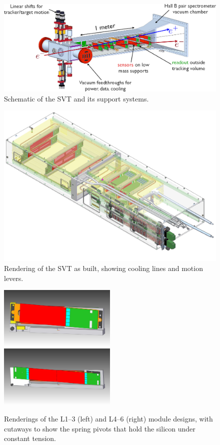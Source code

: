 \begin{figure}[ht]
    \includegraphics[width=\textwidth]{detector/figs/svt_cutaway}
    \caption{Schematic of the SVT and its support systems.}
    \label{fig:svt-schematic}
\end{figure}

\begin{figure}[ht]
    \includegraphics[width=\textwidth]{detector/figs/svt_drawing}
    \caption{Rendering of the SVT as built, showing cooling lines and motion levers.}
    \label{fig:svt-drawing}
\end{figure}

\begin{figure}[ht]
    \includegraphics[width=0.5\textwidth]{detector/figs/svt_l123_drawing}
    \includegraphics[width=0.5\textwidth]{detector/figs/svt_l456_drawing}
    \caption{Renderings of the L1--3 (left) and L4--6 (right) module designs, with cutaways to show the spring pivots that hold the silicon under constant tension.}
    \label{fig:svt-module-drawing}
\end{figure}


